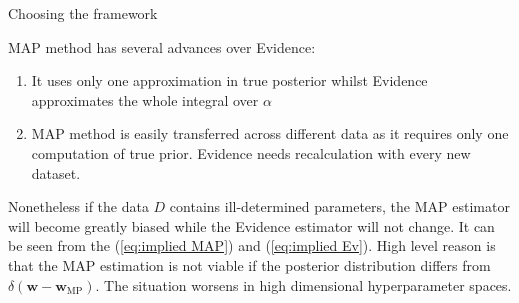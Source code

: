 \documentclass[10pt]{beamer}
\theoremstyle{definition}
\begin{document}
	\begin{frame}{Choosing the framework}
		
		MAP method has several advances over Evidence:
		
		\begin{enumerate}
			\item It uses only one approximation in true posterior whilst Evidence approximates the whole integral over $ \alpha $	
			\item MAP method is easily transferred across different data as it requires only one computation of true prior. Evidence needs recalculation with every new dataset.
		\end{enumerate}
		
		Nonetheless if the data $ D $ contains ill-determined parameters, the MAP estimator will become greatly biased while the Evidence estimator will not change. It can be seen from the (\ref{eq:implied MAP}) and (\ref{eq:implied Ev}). High level reason is that the MAP estimation is not viable if the posterior distribution differs from $ \delta(\mathbf{w} - \mathbf{w}_{\text{MP}}) $. The situation worsens in high dimensional hyperparameter spaces.
		
	\end{frame}
	
\end{document}
